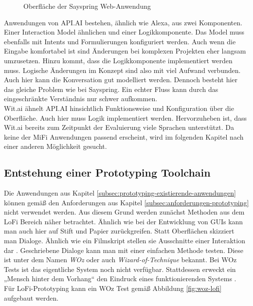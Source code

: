 \begin{figure}[!htb]
    \centering
    \caption{Oberfläche der Sayspring Web-Anwendung}
    \label{fig:sayspring-gui}
\end{figure}

Anwendungen von API.AI bestehen, ähnlich wie Alexa, aus zwei Komponenten. Einer Interaction Model ähnlichen und einer Logikkomponente. Das Model muss ebenfalls mit Intents und Formulierungen konfiguriert werden. Auch wenn die Eingabe komfortabel ist sind Änderungen bei komplexen Projekten eher langsam umzusetzen. Hinzu kommt, dass die Logikkomponente implementiert werden muss. Logische Änderungen im Konzept sind also mit viel Aufwand verbunden. Auch hier kann die Konversation gut modelliert werden. Dennoch besteht hier das gleiche Problem wie bei Sayspring. Ein echter Fluss kann durch das eingeschränkte Verständnis nur schwer aufkommen.\\
Wit.ai ähnelt API.AI hinsichtlich Funktionsweise und Konfiguration über die Oberfläche. Auch hier muss Logik implementiert werden. Hervorzuheben ist, dass Wit.ai bereits zum Zeitpunkt der Evaluierung viele Sprachen unterstützt. Da keine der \ac{MiFi} Anwendungen passend erscheint, wird im folgenden Kapitel nach einer anderen Möglichkeit gesucht.

\subsection{Entstehung einer Prototyping Toolchain}
\label{subsec:prototyping-entstehung-toolchain}
Die Anwendungen aus Kapitel \ref{subsec:prototyping-existierende-anwendungen} können gemäß den Anforderungen aus Kapitel \ref{subsec:anforderungen-prototyping} nicht verwendet werden. Aus diesem Grund werden zunächst Methoden aus dem \ac{LoFi} Bereich näher betrachtet. Ähnlich wie bei der Entwicklung von \acp{GUI} kann man auch hier auf Stift und Papier zurückgreifen. Statt Oberflächen skizziert man Dialoge. Ähnlich wie ein Filmskript stellen sie Ausschnitte einer Interaktion dar \cite{pearl-design-vui}. Geschriebene Dialoge kann man mit einer einfachen Methode testen. Diese ist unter dem Namen \textit{\ac{WOz}} oder auch \textit{Wizard-of-Technique} bekannt. Bei \ac{WOz} Tests ist das eigentliche System noch nicht verfügbar. Stattdessen erweckt ein „Mensch hinter dem Vorhang“ den Eindruck eines funktionierenden Systems \cite{pearl-design-vui}. Für \ac{LoFi}-Prototyping kann ein \ac{WOz} Test gemäß Abbildung \ref{fig:woz-lofi} aufgebaut werden.

